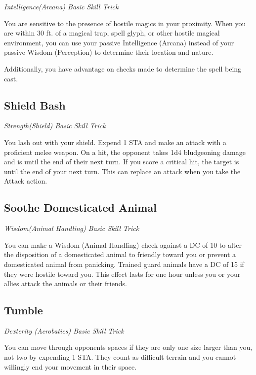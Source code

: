 \textit{Intelligence(Arcana) Basic Skill Trick}

You are sensitive to the presence of hostile magics in your proximity. When you are within 30 ft. of a magical trap, spell glyph, or other hostile magical environment, you can use your passive Intelligence (Arcana) instead of your passive Wisdom (Perception) to determine their location and nature.

Additionally, you have advantage on checks made to determine the spell being cast.

\subsection{Shield Bash}

\textit{Strength(Shield) Basic Skill Trick}

You lash out with your shield. Expend 1 STA and make an attack with a proficient melee weapon. On a hit, the opponent takes 1d4 bludgeoning damage and is  until the end of their next turn. If you score a critical hit, the target is  until the end of your next turn. This can replace an attack when you take the Attack action.

\subsection{Soothe Domesticated Animal}\label{st:soothe-domesticated-animal}

\textit{Wisdom(Animal Handling) Basic Skill Trick}

You can make a Wisdom (Animal Handling) check against a DC of 10 to alter the disposition of a domesticated animal to friendly toward you or prevent a domesticated animal from panicking. Trained guard animals have a DC of 15 if they were hostile toward you. This effect lasts for one hour unless you or your allies attack the animals or their friends.

\subsection{Tumble}\label{st:tumble}

\textit{Dexterity (Acrobatics) Basic Skill Trick}

You can move through opponents spaces if they are only one size larger than you, not two by expending 1 STA. They count as difficult terrain and you cannot willingly end your movement in their space.

